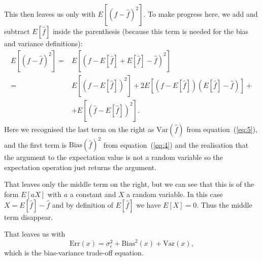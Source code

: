 \documentclass[12pt]{article}
\begin{document}
This then leaves us only with $E[(f-\hat{f})^2]$. To make progress here, we add and subtract $E[\hat{f}]$ inside the parenthesis (because this term is needed for the bias and variance definitions):
\begin{align}
  \label{eq:7}
 E\left[(f-\hat{f})^2\right]  = & E\left[(f-E[\hat{f}] + E[\hat{f}] - \hat{f})^2\right] \\
  = & E\left[ (f-E[\hat{f}])^2\right] + 2 E\left[\left(f-E[\hat{f}]\right) \left(E[\hat{f}]-\hat{f}\right)\right] + \\
& + E\left[ (\hat{f}-E[\hat{f}])^2\right].
\end{align}
Here we recognised the last term on the right as $\mathrm{Var}(\hat{f})$ from equation~(\ref{eq:5}), and the first term is $\mathrm{Bias}(\hat{f})^2$ from equation~(\ref{eq:4}) and the realisation that the argument to the expectation value is not a random variable so the expectation operation just returns the argument.  

That leaves only the middle term on the right, but we can see that this is of the form $E[a X]$ with $a$ a constant and $X$ a random variable. In this case $X=E[\hat{f}]-\hat{f}$ and by definition of $E[\hat{f}]$ we have $E[X]=0$. Thus the middle term disappear. 

That leaves us with 
\begin{equation}
  \label{eq:8}
  \mathrm{Err}(x) = \sigma_\epsilon^2 + \mathrm{Bias}^2(x) + \mathrm{Var}(x),
\end{equation}
which is the bias-variance trade-off equation.
\end{document}
